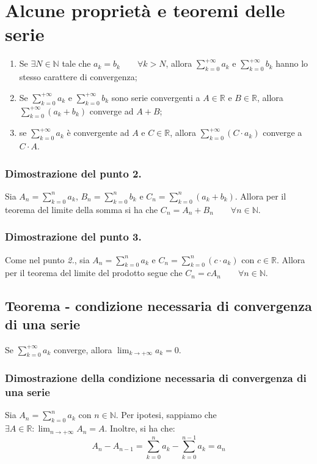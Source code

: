 \documentclass{article}
\begin{document}
\section{Alcune proprietà e teoremi delle serie}
\begin{enumerate}
    \item Se $\exists N \in \mathbb{N}$ tale che $a_k = b_k \qquad \forall k > N$, allora $\sum_{k = 0}^{+\infty} a_k$ e $\sum_{k = 0}^{+\infty} b_k$ hanno lo stesso carattere di convergenza;
    \item Se $\sum_{k = 0}^{+\infty} a_k$ e $\sum_{k = 0}^{+\infty} b_k$ sono serie convergenti a $A \in \mathbb{R}$ e $B \in \mathbb{R}$, allora $\sum_{k = 0}^{+\infty} (a_k + b_k)$ converge ad $A + B$;
    \item se $\sum_{k = 0}^{+\infty} a_k$ è convergente ad $A$ e $C \in \mathbb{R}$, allora $\sum_{k = 0}^{+\infty} (C \cdot a_k)$ converge a $C \cdot A$.
\end{enumerate}

\subsubsection{Dimostrazione del punto 2.}
Sia $A_n = \sum_{k = 0}^n a_k$, $B_n = \sum_{k = 0}^n b_k$ e $C_n = \sum_{k = 0}^n (a_k + b_k)$. Allora per il teorema del limite della somma si ha che $C_n = A_n + B_n \qquad \forall n \in \mathbb{N}$.

\subsubsection{Dimostrazione del punto 3.}
Come nel punto \textit{2.}, sia $A_n = \sum_{k = 0}^n a_k$ e $C_n = \sum_{k = 0}^n (c \cdot a_k)$ con $c \in \mathbb{R}$. Allora per il teorema del limite del prodotto segue che $C_n = c A_n \qquad \forall n \in \mathbb{N}$.

\subsection{Teorema - condizione necessaria di convergenza di una serie}
Se $\sum_{k = 0}^{+\infty} a_k$ converge, allora $\lim_{k \to +\infty} a_k = 0$.

\subsubsection{Dimostrazione della condizione necessaria di convergenza di una serie}
Sia $A_n = \sum_{k = 0}^n a_k$ con $n \in \mathbb{N}$. Per ipotesi, sappiamo che $\exists A \in \mathbb{R} : \lim_{n \to +\infty} A_n = A$. Inoltre, si ha che:
\begin{equation*}
    A_n - A_{n - 1} = \sum_{k = 0}^n a_k - \sum_{k = 0}^{n - 1} a_k = a_n
\end{equation*}
\end{document}
